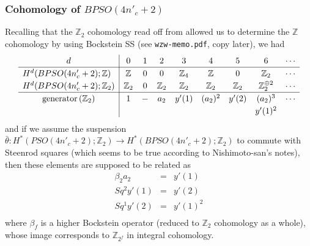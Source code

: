 \documentclass[12pt]{article}
\numberwithin{equation}{section}
\def\bZ{\mathbb{Z}}
\begin{document}
\subsubsection{Cohomology of $BPSO(4n'_c+2)$}
Recalling that the $\bZ_2$ cohomology read off from \cite{KonoMimura1974}
allowed us to determine the $\bZ$ cohomology by using Bockstein SS
(see \texttt{wzw-memo.pdf}, copy later), we had
\begin{equation}
	\renewcommand{\arraystretch}{1.2}
	\begin{array}{c|cccccccccccccccc}
		d & 0 & 1 & 2 & 3 & 4 & 5 & 6 & \cdots \\
		\hline
		\multicolumn{1}{l|}{H^d(BPSO(4n'_c+2);\bZ)} & \bZ & 0 & 0 & \bZ_4 & \bZ & 0 & \bZ_2 & \cdots\\
		\multicolumn{1}{l|}{H^d(BPSO(4n'_c+2);\bZ_2)} & \bZ_2 & 0 & \bZ_2 & \bZ_2 & \bZ_2 & \bZ_2 & \bZ_2^{\oplus 2} & \cdots\\
		\hline
		\text{generator} \,(\bZ_2) & 1 & - & a_2 & y'(1) & (a_2)^2 & y'(2) & (a_2)^3 & \cdots\\
		&&&&&&& y'(1)^2\\
	\end{array}
\end{equation}
and if we assume the suspension $\bar\theta: H^\ast(PSO(4n'_c+2);\bZ_2) \to H^\ast(BPSO(4n'_c+2);\bZ_2)$
to commute with Steenrod squares (which seems to be true according to Nishimoto-san's notes),
then these elements are supposed to be related as
\begin{equation*}
	\begin{array}{ccl}
		\beta_2 a_2 & = & y'(1)\\
		Sq^2 y'(1) & = & y'(2)\\
		Sq^1 y'(2) & = & y'(1)^2\\
	\end{array}
\end{equation*}
where $\beta_f$ is a higher Bockstein operator (reduced to $\bZ_2$ cohomology as a whole),
whose image corresponds to $\bZ_{2^f}$ in integral cohomology.
\end{document}
